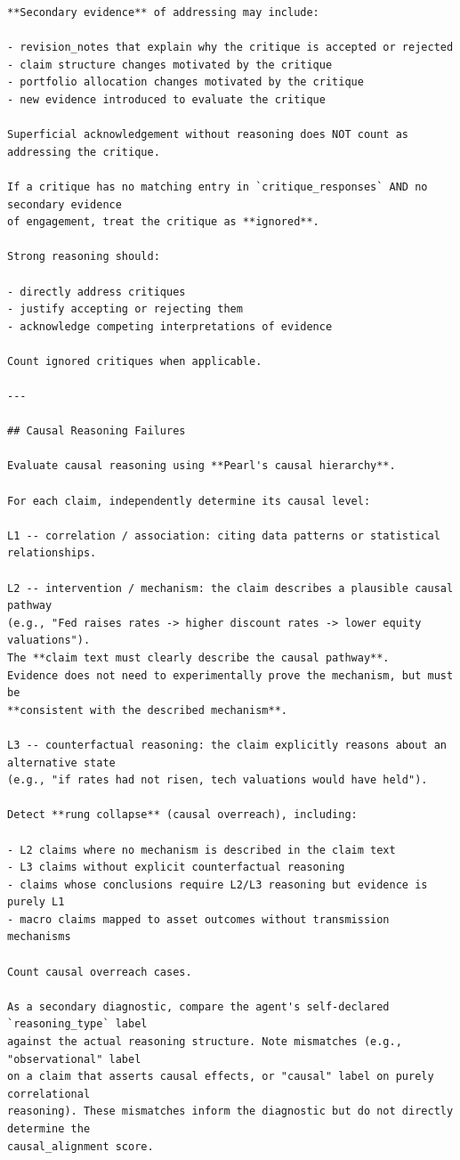 \documentclass{article}
\begin{document}
\begin{lstlisting}[backgroundcolor=\color{promptbg}]
**Secondary evidence** of addressing may include:

- revision_notes that explain why the critique is accepted or rejected
- claim structure changes motivated by the critique
- portfolio allocation changes motivated by the critique
- new evidence introduced to evaluate the critique

Superficial acknowledgement without reasoning does NOT count as addressing the critique.

If a critique has no matching entry in `critique_responses` AND no secondary evidence
of engagement, treat the critique as **ignored**.

Strong reasoning should:

- directly address critiques
- justify accepting or rejecting them
- acknowledge competing interpretations of evidence

Count ignored critiques when applicable.

---

## Causal Reasoning Failures

Evaluate causal reasoning using **Pearl's causal hierarchy**.

For each claim, independently determine its causal level:

L1 -- correlation / association: citing data patterns or statistical relationships.

L2 -- intervention / mechanism: the claim describes a plausible causal pathway
(e.g., "Fed raises rates -> higher discount rates -> lower equity valuations").
The **claim text must clearly describe the causal pathway**.
Evidence does not need to experimentally prove the mechanism, but must be
**consistent with the described mechanism**.

L3 -- counterfactual reasoning: the claim explicitly reasons about an alternative state
(e.g., "if rates had not risen, tech valuations would have held").

Detect **rung collapse** (causal overreach), including:

- L2 claims where no mechanism is described in the claim text
- L3 claims without explicit counterfactual reasoning
- claims whose conclusions require L2/L3 reasoning but evidence is purely L1
- macro claims mapped to asset outcomes without transmission mechanisms

Count causal overreach cases.

As a secondary diagnostic, compare the agent's self-declared `reasoning_type` label
against the actual reasoning structure. Note mismatches (e.g., "observational" label
on a claim that asserts causal effects, or "causal" label on purely correlational
reasoning). These mismatches inform the diagnostic but do not directly determine the
causal_alignment score.


\end{lstlisting}
\end{document}
